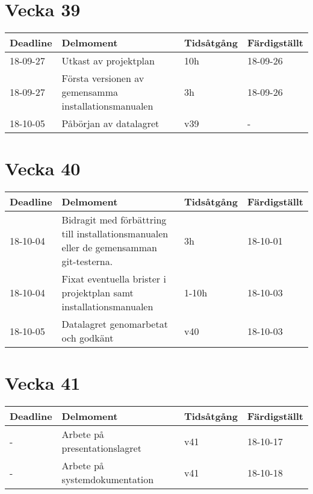 \documentclass{TDP003mall}
\begin{document}
\section{Vecka 39}
\begin{table}[!h]
\begin{tabularx}{\linewidth}{|l|X|l|l|}
\hline
\textbf{Deadline} & \textbf{Delmoment} & \textbf{Tidsåtgång} & \textbf{Färdigställt}\\\hline
18-09-27 & Utkast av projektplan & 10h & 18-09-26  \\\hline
18-09-27 & Första versionen av gemensamma installationsmanualen
& 3h & 18-09-26 \\\hline
18-10-05 & Påbörjan av datalagret & v39 & - \\\hline
\end{tabularx}
\end{table}
\newpage
\section{Vecka 40}
\begin{table}[!h]
\begin{tabularx}{\linewidth}{|l|X|l|l|}\hline
\textbf{Deadline} & \textbf{Delmoment} & \textbf{Tidsåtgång} & \textbf{Färdigställt}\\\hline
18-10-04 & Bidragit med förbättring till installationsmanualen
eller de gemensamman git-testerna.& 3h & 18-10-01  \\\hline
18-10-04 & Fixat eventuella brister i projektplan samt installationsmanualen & 1-10h & 18-10-03 \\\hline
18-10-05 & Datalagret genomarbetat och godkänt & v40 & 18-10-03 \\\hline
\end{tabularx}
\end{table}

\section{Vecka 41}
\begin{table}[!h]
\begin{tabularx}{\linewidth}{|l|X|l|l|}\hline
\textbf{Deadline} & \textbf{Delmoment} & \textbf{Tidsåtgång} & \textbf{Färdigställt}\\\hline
- & Arbete på presentationslagret & v41 & 18-10-17\\\hline
- & Arbete på systemdokumentation & v41 & 18-10-18\\\hline
\end{tabularx}
\end{table}
\end{document}
